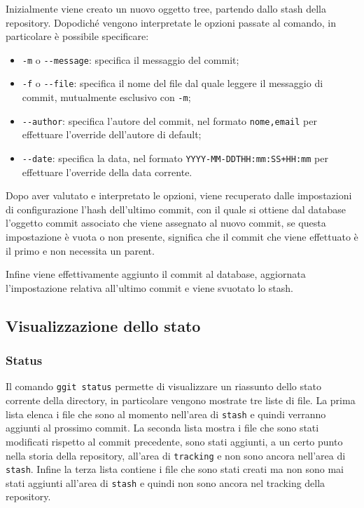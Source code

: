 Inizialmente viene creato un nuovo oggetto tree, partendo dallo stash della repository. Dopodiché vengono interpretate le opzioni passate al comando, in particolare è possibile specificare:
\begin{itemize}
    \item \texttt{-m} o \texttt{-{}-message}: specifica il messaggio del commit;
    \item \texttt{-f} o \texttt{-{}-file}: specifica il nome del file dal quale leggere il messaggio di commit, mutualmente esclusivo con \texttt{-m};
    \item \texttt{-{}-author}: specifica l'autore del commit, nel formato \texttt{nome,email} per effettuare l'override dell'autore di default;
    \item \texttt{-{}-date}: specifica la data, nel formato \texttt{YYYY-MM-DDTHH:mm:SS+HH:mm} per effettuare l'override della data corrente.
\end{itemize}
Dopo aver valutato e interpretato le opzioni, viene recuperato dalle impostazioni di configurazione l'hash dell'ultimo commit, con il quale si ottiene dal database l'oggetto commit associato che viene assegnato al nuovo commit, se questa impostazione è vuota o non presente, significa che il commit che viene effettuato è il primo e non necessita un parent.

Infine viene effettivamente aggiunto il commit al database, aggiornata l'impostazione relativa all'ultimo commit e viene svuotato lo stash.

\subsection{Visualizzazione dello stato}
\subsubsection{Status}
Il comando \texttt{ggit status} permette di visualizzare un riassunto dello stato corrente della directory, in particolare vengono mostrate tre liste di file.
La prima lista elenca i file che sono al momento nell'area di \texttt{stash} e quindi verranno aggiunti al prossimo commit.
La seconda lista mostra i file che sono stati modificati rispetto al commit precedente, sono stati aggiunti, a un certo punto nella storia della repository, all'area di \texttt{tracking} e non sono ancora nell'area di \texttt{stash}. Infine la terza lista contiene i file che sono stati creati ma non sono mai stati aggiunti all'area di \texttt{stash} e quindi non sono ancora nel tracking della repository.

